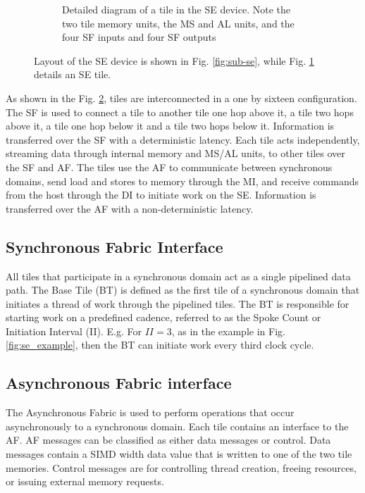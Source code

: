 \begin{figure} [h]
\begin{subfigure}{.5\textwidth}
  \caption{Detailed diagram of a tile in the SE device.
  Note the two tile memory units, the MS and AL units, and the four SF inputs and four SF outputs}
  \label{fig:sub-tile}
  \end{subfigure}
  \caption{
    Layout of the SE device is shown in Fig. \ref{fig:sub-se}, while Fig. \ref{fig:sub-tile} details an SE tile.
  }
  \label{fig:se_diagram}
\end{figure}

As shown in the Fig. \ref{fig:se_diagram}, tiles are interconnected in a one by sixteen configuration.
The SF is used to connect a tile to another tile one hop above it, a tile two hops above it, a tile one hop below it and a tile two hops below it.
Information is transferred over the SF with a deterministic latency. 
Each tile acts independently, streaming data through internal memory and MS/AL units, to other tiles over the SF and AF.
The tiles use the AF to communicate between synchronous domains, send load and stores to memory through the MI, and receive commands from the host through the DI to initiate work on the SE.
Information is transferred over the AF with a non-deterministic latency.


\subsection{Synchronous Fabric Interface}
All tiles that participate in a synchronous domain act as a single pipelined data path.
The Base Tile (BT) is defined as the first tile of a synchronous domain that initiates a thread of work through the pipelined tiles.
The BT is responsible for starting work on a predefined cadence, referred to as the Spoke Count or Initiation Interval (II).
E.g. For $II = 3$, as in the example in Fig. \ref{fig:se_example}, then the BT can initiate work every third clock cycle.

\subsection{Asynchronous Fabric interface}
The Asynchronous Fabric is used to perform operations that occur asynchronously to a synchronous domain.
Each tile contains an interface to the AF.
AF messages can be classified as either data messages or control.
Data messages contain a SIMD width data value that is written to one of the two tile memories.
Control messages are for controlling thread creation, freeing resources, or issuing external memory requests.

